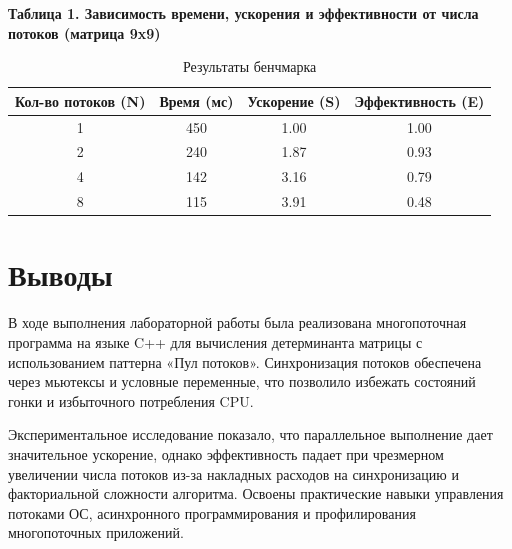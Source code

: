 \documentclass[12pt, a4paper]{article}
\begin{document}
\textbf{Таблица 1. Зависимость времени, ускорения и эффективности от числа потоков (матрица 9x9)}

\begin{table}[H]
    \centering
    \begin{tabular}{@{}cccc@{}}
        \toprule
        \textbf{Кол-во потоков (N)} & \textbf{Время (мс)} & \textbf{Ускорение (S)} & \textbf{Эффективность (E)} \\ \midrule
        1 & 450 & 1.00 & 1.00 \\
        2 & 240 & 1.87 & 0.93 \\
        4 & 142 & 3.16 & 0.79 \\
        8 & 115 & 3.91 & 0.48 \\ \bottomrule
    \end{tabular}
    \caption{Результаты бенчмарка}
    \label{tab:benchmark}
\end{table}

\newpage

\section{Выводы}

В ходе выполнения лабораторной работы была реализована многопоточная программа на языке C++ для вычисления детерминанта матрицы с использованием паттерна «Пул потоков». Синхронизация потоков обеспечена через мьютексы и условные переменные, что позволило избежать состояний гонки и избыточного потребления CPU. 

Экспериментальное исследование показало, что параллельное выполнение дает значительное ускорение, однако эффективность падает при чрезмерном увеличении числа потоков из-за накладных расходов на синхронизацию и факториальной сложности алгоритма. Освоены практические навыки управления потоками ОС, асинхронного программирования и профилирования многопоточных приложений.
\end{document}
